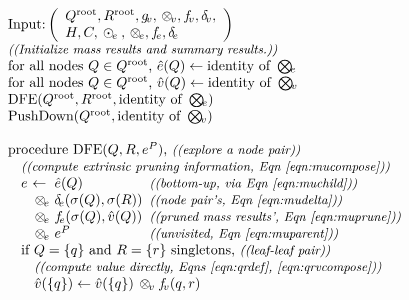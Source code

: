 \documentclass[twoside,leqno,twocolumn]{article}
\newcommand{\com}[1]{{\small \textit{((#1))}}}
\newcommand{\summary}{\delta}
\newcommand{\psty}{}
\newcommand{\X}{\\ \psty}
\newcommand{\x}{\X \hspace{0.13in}}
\newcommand{\xx}{\X \hspace{0.26in}}
\newcommand{\kdroot}[1]{#1^{\text{root}}}
\newcommand{\nameOp}[2]{\mathop{#1\nolimits\!\!_{#2}}}
\newcommand{\nameop}[2]{{\scriptstyle\:}#1_{\!#2}}
\newcommand{\myOp}[1]{\nameOp{\bigotimes}{#1}}
\newcommand{\myop}[1]{\nameop{\otimes}{#1}}
\newcommand{\letterqr}{v}
\newcommand{\Opqr}{\myOp{\letterqr}}
\newcommand{\opqr}{\myop{\letterqr}}
\newcommand{\fqr}{f_{\!\letterqr}}
\newcommand{\gqr}{g_{\!\letterqr}}
\newcommand{\letterqrv}{v}
\newcommand{\deltaqrv}{\summary_{\!\letterqrv}}
\newcommand{\varqrv}{\hat{\letterqrv}}
\newcommand{\lettermu}{e}
\newcommand{\inmu}{e}
\newcommand{\outopmu}{\:\odot_{\!\lettermu}\:}
\newcommand{\Opmu}{\myOp{\lettermu}}
\newcommand{\opmu}{\myop{\lettermu}}
\newcommand{\fmuv}{f_{\!\lettermu}}
\newcommand{\deltamu}{\summary_{\!\lettermu}}
\newcommand{\canprunemu}{C}
\newcommand{\heurqr}{H}
\newcommand{\varmuchild}{\hat{\lettermu}}
\newcommand{\varmuparent}{\lettermu^{P}}
\newcommand{\outstat}{\sigma}
\begin{document}
\begin{figure}
  \vspace{-0.3in}
\[
  \begin{array}[t]{l}
    \\ \text{Input:}\left(
        \begin{array}[c]{l}\kdroot{Q}, \kdroot{R}, \gqr, \opqr, \fqr, \deltaqrv, \\ \heurqr, \canprunemu, \outopmu, \opmu, \fmuv, \deltamu\end{array}\right)
    \X \text{\com{Initialize mass results and summary results.}}
    \X \text{for all nodes } Q \in \kdroot{Q}\text{, } \varmuchild(Q) \gets \text{identity of }\Opmu
    \X \text{for all nodes } Q \in \kdroot{Q}\text{, } \varqrv(Q) \gets \text{identity of }\Opqr
    \X \text{DFE}(\kdroot{Q}, \kdroot{R}, \text{identity of }\Opmu)
    \X \text{PushDown}(\kdroot{Q}, \text{identity of }\Opqr)
    \X
    \X \text{procedure DFE}(Q, R, \varmuparent)\text{, \com{explore a node pair}}
    \x \text{\com{compute extrinsic pruning information, Eqn~\ref{eqn:mucompose}}}
    \x \!\!\!\begin{array}{llll}
         \psty\lettermu &\psty\!\!\!\!\gets\!\!\!\!& \psty\varmuchild(Q)                     & \!\!\!\text{\com{bottom-up, via Eqn~\ref{eqn:muchild}}}
         \\             &\psty\!\!\!\!\opmu\!\!\!\!& \psty\deltamu(\outstat(Q), \outstat(R)) & \!\!\!\text{\com{node pair's, Eqn~\ref{eqn:mudelta}}}
         \\             &\psty\!\!\!\!\opmu\!\!\!\!& \psty\fmuv(\outstat(Q), \varqrv(Q))     & \!\!\!\text{\com{pruned mass results', Eqn~\ref{eqn:muprune}}}
         \\             &\psty\!\!\!\!\opmu\!\!\!\!& \psty\varmuparent                       & \!\!\!\text{\com{unvisited, Eqn~\ref{eqn:muparent}}}
       \end{array}
    \x \text{if } Q = \{q\}\text{ and }R = \{r\}\text{ singletons, \com{leaf-leaf pair}}
    \xx \text{\com{compute value directly, Eqns \ref{eqn:qrdef}, \ref{eqn:qrvcompose}}}
    \xx \varqrv(\{q\}) \gets \varqrv(\{q\}) \opqr \fqr(q, r)

\end{array}\]
\end{figure}
\end{document}
